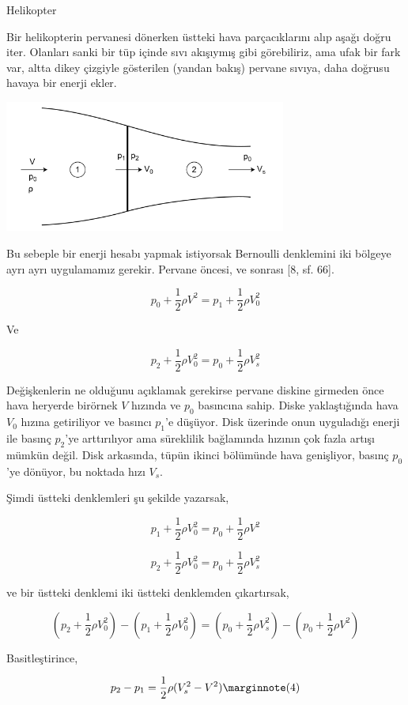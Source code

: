 \documentclass[12pt,fleqn]{article}\usepackage{../../common}
\begin{document}
Helikopter

Bir helikopterin pervanesi dönerken üstteki hava parçacıklarını alıp aşağı
doğru iter. Olanları sanki bir tüp içinde sıvı akışıymış gibi görebiliriz,
ama ufak bir fark var, altta dikey çizgiyle gösterilen (yandan bakış)
pervane sıvıya, daha doğrusu havaya bir enerji ekler.

\includegraphics[width=25em]{phy_045_flight_03.png}

Bu sebeple bir enerji hesabı yapmak istiyorsak Bernoulli denklemini iki
bölgeye ayrı ayrı uygulamamız gerekir. Pervane öncesi, ve sonrası [8,
sf. 66].

$$
p_0 + \frac{1}{2} \rho V^2 = p_1 + \frac{1}{2} \rho V_0^2
$$

Ve

$$
p_2 + \frac{1}{2} \rho V_0^2 = p_0 + \frac{1}{2} \rho V_s^2
$$

Değişkenlerin ne olduğunu açıklamak gerekirse pervane diskine girmeden önce
hava heryerde birörnek $V$ hızında ve $p_0$ basıncına sahip. Diske
yaklaştığında hava $V_0$ hızına getiriliyor ve basıncı $p_1$'e
düşüyor. Disk üzerinde onun uyguladığı enerji ile basınç $p_2$'ye
arttırılıyor ama süreklilik bağlamında hızının çok fazla artışı mümkün
değil. Disk arkasında, tüpün ikinci bölümünde hava genişliyor, basınç
$p_0$'ye dönüyor, bu noktada hızı $V_s$.

Şimdi üstteki denklemleri şu şekilde yazarsak, 

$$
p_1 + \frac{1}{2} \rho V_0^2 = p_0 + \frac{1}{2} \rho V^2
$$

$$
p_2 + \frac{1}{2} \rho V_0^2 = p_0 + \frac{1}{2} \rho V_s^2
$$

ve bir üstteki denklemi iki üstteki denklemden çıkartırsak, 

$$
\left(p_2 + \frac{1}{2} \rho V_0^2 \right) - 
\left(p_1 + \frac{1}{2} \rho V_0^2 \right) = 
\left(p_0 + \frac{1}{2} \rho V_s^2 \right) - 
\left(p_0 + \frac{1}{2} \rho V^2 \right)
$$

Basitleştirince,

$$
p_2 - p_1 = \frac{1}{2} \rho (V_s^2 - V^2)
\mlabel{4}
$$
\end{document}
